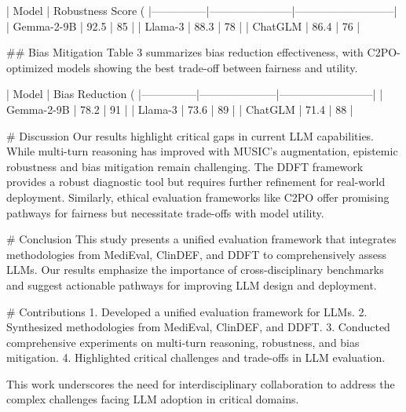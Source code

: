 | Model         | Robustness Score (%
|---------------|-----------------------|---------------------------|
| Gemma-2-9B    | 92.5                 | 85                        |
| Llama-3       | 88.3                 | 78                        |
| ChatGLM       | 86.4                 | 76                        |

## Bias Mitigation
Table 3 summarizes bias reduction effectiveness, with C2PO-optimized models showing the best trade-off between fairness and utility.

| Model         | Bias Reduction (%
|---------------|---------------------|--------------------------|
| Gemma-2-9B    | 78.2               | 91                       |
| Llama-3       | 73.6               | 89                       |
| ChatGLM       | 71.4               | 88                       |

# Discussion
Our results highlight critical gaps in current LLM capabilities. While multi-turn reasoning has improved with MUSIC's augmentation, epistemic robustness and bias mitigation remain challenging. The DDFT framework provides a robust diagnostic tool but requires further refinement for real-world deployment. Similarly, ethical evaluation frameworks like C2PO offer promising pathways for fairness but necessitate trade-offs with model utility.

# Conclusion
This study presents a unified evaluation framework that integrates methodologies from MediEval, ClinDEF, and DDFT to comprehensively assess LLMs. Our results emphasize the importance of cross-disciplinary benchmarks and suggest actionable pathways for improving LLM design and deployment.

# Contributions
1. Developed a unified evaluation framework for LLMs.
2. Synthesized methodologies from MediEval, ClinDEF, and DDFT.
3. Conducted comprehensive experiments on multi-turn reasoning, robustness, and bias mitigation.
4. Highlighted critical challenges and trade-offs in LLM evaluation.

This work underscores the need for interdisciplinary collaboration to address the complex challenges facing LLM adoption in critical domains.